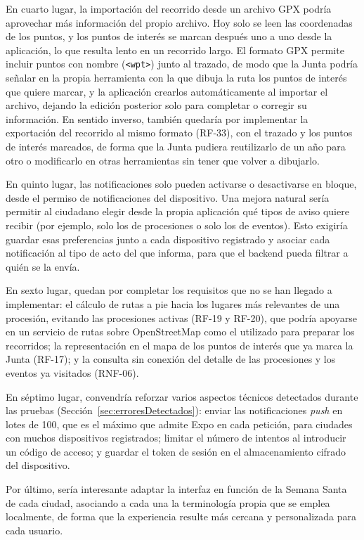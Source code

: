 En cuarto lugar, la importación del recorrido desde un archivo GPX podría aprovechar más información del propio archivo. Hoy solo se leen las coordenadas de los puntos, y los puntos de interés se marcan después uno a uno desde la aplicación, lo que resulta lento en un recorrido largo. El formato GPX permite incluir puntos con nombre (\texttt{<wpt>}) junto al trazado, de modo que la Junta podría señalar en la propia herramienta con la que dibuja la ruta los puntos de interés que quiere marcar, y la aplicación crearlos automáticamente al importar el archivo, dejando la edición posterior solo para completar o corregir su información. En sentido inverso, también quedaría por implementar la exportación del recorrido al mismo formato (RF-33), con el trazado y los puntos de interés marcados, de forma que la Junta pudiera reutilizarlo de un año para otro o modificarlo en otras herramientas sin tener que volver a dibujarlo.

En quinto lugar, las notificaciones solo pueden activarse o desactivarse en bloque, desde el permiso de notificaciones del dispositivo. Una mejora natural sería permitir al ciudadano elegir desde la propia aplicación qué tipos de aviso quiere recibir (por ejemplo, solo los de procesiones o solo los de eventos). Esto exigiría guardar esas preferencias junto a cada dispositivo registrado y asociar cada notificación al tipo de acto del que informa, para que el backend pueda filtrar a quién se la envía.

En sexto lugar, quedan por completar los requisitos que no se han llegado a implementar: el cálculo de rutas a pie hacia los lugares más relevantes de una procesión, evitando las procesiones activas (RF-19 y RF-20), que podría apoyarse en un servicio de rutas sobre OpenStreetMap como el utilizado para preparar los recorridos; la representación en el mapa de los puntos de interés que ya marca la Junta (RF-17); y la consulta sin conexión del detalle de las procesiones y los eventos ya visitados (RNF-06).

En séptimo lugar, convendría reforzar varios aspectos técnicos detectados durante las pruebas (Sección~\ref{sec:erroresDetectados}): enviar las notificaciones \emph{push} en lotes de 100, que es el máximo que admite Expo en cada petición, para ciudades con muchos dispositivos registrados; limitar el número de intentos al introducir un código de acceso; y guardar el token de sesión en el almacenamiento cifrado del dispositivo.

Por último, sería interesante adaptar la interfaz en función de la Semana Santa de cada ciudad, asociando a cada una la terminología propia que se emplea localmente, de forma que la experiencia resulte más cercana y personalizada para cada usuario.

